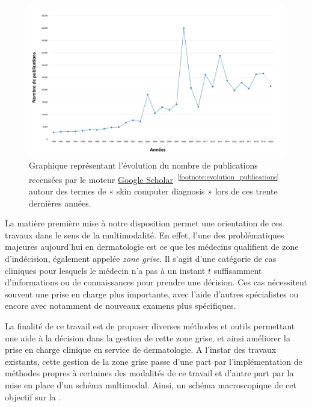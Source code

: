 \begin{figure}[H]
    \centering
    \includegraphics[width=\linewidth]{contents/i_introduction/resources/evolution_publications.pdf}
    \caption{Graphique représentant l'évolution du nombre de publications recensées par le moteur \href{https://scholar.google.fr/}{Google Scholar}~\textsuperscript{\ref{footnote:evolution_publications}} autour des termes de « skin computer diagnosis » lors de ces trente dernières années.}
    \label{fig:evolution_publications}
\end{figure}\par
\addtocounter{footnote}{1}

La matière première mise à notre disposition permet une orientation de ces travaux dans le sens de la multimodalité. En effet, l'une des problématiques majeures aujourd'hui en dermatologie est ce que les médecins qualifient de zone d'indécision, également appelée \textit{zone grise}. Il s'agit d'une catégorie de cas cliniques pour lesquels le médecin n'a pas à un instant $t$ suffisamment d'informations ou de connaissances pour prendre une décision. Ces cas nécessitent souvent une prise en charge plus importante, avec l'aide d'autres spécialistes ou encore avec notamment de nouveaux examens plus spécifiques.\par

La finalité de ce travail est de proposer diverses méthodes et outils permettant une aide à la décision dans la gestion de cette zone grise, et ainsi améliorer la prise en charge clinique en service de dermatologie. A l'instar des travaux existants, cette gestion de la zone grise passe d'une part par l'implémentation de méthodes propres à certaines des modalités de ce travail et d'autre part par la mise en place d'un schéma multimodal. Ainsi, un schéma macroscopique de cet objectif sur la .\par
\clearpage

